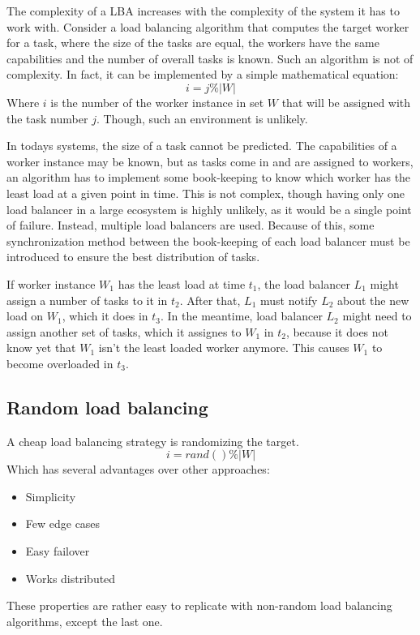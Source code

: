 The complexity of a \ac{LBA} increases with the complexity of the system it has
to work with.
Consider a load balancing algorithm that computes the target worker for a task,
where the size of the tasks are equal, the workers have the same capabilities
and the number of overall tasks is known.
Such an algorithm is not of complexity.
In fact, it can be implemented by a simple mathematical equation:
\begin{equation}
    i = j \% |W|
\end{equation}
Where $i$ is the number of the worker instance in set $W$ that will be assigned
with the task number $j$.
Though, such an environment is unlikely.

In todays systems, the size of a task cannot be predicted.
The capabilities of a worker instance may be known, but as tasks come in and are
assigned to workers, an algorithm has to implement some book-keeping to know
which worker has the least load at a given point in time.
This is not complex, though having only one load balancer in a large ecosystem
is highly unlikely, as it would be a single point of failure.
Instead, multiple load balancers are used.
Because of this, some synchronization method between the book-keeping of each
load balancer must be introduced to ensure the best distribution of tasks.

If worker instance $W_1$ has the least load at time $t_1$, the load balancer
$L_1$ might assign a number of tasks to it in $t_2$.
After that, $L_1$ must notify $L_2$ about the new load on $W_1$, which it does
in $t_3$.
In the meantime, load balancer $L_2$ might need to assign another set of tasks,
which it assignes to $W_1$ in $t_2$, because it does not know yet that $W_1$
isn't the least loaded worker anymore.
This causes $W_1$ to become overloaded in $t_3$.

\subsection{Random load balancing}

A cheap load balancing strategy is randomizing the target.
\begin{equation}
    i = rand() \% |W|
\end{equation}
Which has several advantages over other approaches:
\begin{itemize}
    \item Simplicity
    \item Few edge cases
    \item Easy failover
    \item Works distributed
\end{itemize} %
These properties are rather easy to replicate with non-random load balancing
algorithms, except the last one.

